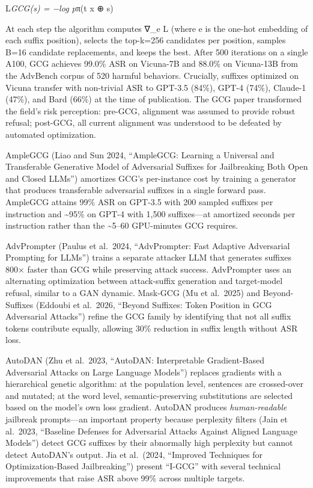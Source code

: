 \documentclass{article}
\begin{document}
L\emph{GCG(s) = −log p}π(t \textbar{} x ⊕ s)

At each step the algorithm computes ∇\_e L (where e is the one-hot embedding of each suffix position), selects the top-k=256 candidates per position, samples B=16 candidate replacements, and keeps the best. After 500 iterations on a single A100, GCG achieves 99.0\% ASR on Vicuna-7B and 88.0\% on Vicuna-13B from the AdvBench corpus of 520 harmful behaviors. Crucially, suffixes optimized on Vicuna transfer with non-trivial ASR to GPT-3.5 (84\%), GPT-4 (74\%), Claude-1 (47\%), and Bard (66\%) at the time of publication. The GCG paper transformed the field's risk perception: pre-GCG, alignment was assumed to provide robust refusal; post-GCG, all current alignment was understood to be defeated by automated optimization.

AmpleGCG (Liao and Sun 2024, ``AmpleGCG: Learning a Universal and Transferable Generative Model of Adversarial Suffixes for Jailbreaking Both Open and Closed LLMs'') amortizes GCG's per-instance cost by training a generator that produces transferable adversarial suffixes in a single forward pass. AmpleGCG attains 99\% ASR on GPT-3.5 with 200 sampled suffixes per instruction and \textasciitilde95\% on GPT-4 with 1,500 suffixes---at amortized seconds per instruction rather than the \textasciitilde5--60 GPU-minutes GCG requires.

AdvPrompter (Paulus et al.~2024, ``AdvPrompter: Fast Adaptive Adversarial Prompting for LLMs'') trains a separate attacker LLM that generates suffixes 800× faster than GCG while preserving attack success. AdvPrompter uses an alternating optimization between attack-suffix generation and target-model refusal, similar to a GAN dynamic. Mask-GCG (Mu et al.~2025) and Beyond-Suffixes (Eddoubi et al.~2026, ``Beyond Suffixes: Token Position in GCG Adversarial Attacks'') refine the GCG family by identifying that not all suffix tokens contribute equally, allowing 30\% reduction in suffix length without ASR loss.

AutoDAN (Zhu et al.~2023, ``AutoDAN: Interpretable Gradient-Based Adversarial Attacks on Large Language Models'') replaces gradients with a hierarchical genetic algorithm: at the population level, sentences are crossed-over and mutated; at the word level, semantic-preserving substitutions are selected based on the model's own loss gradient. AutoDAN produces \emph{human-readable} jailbreak prompts---an important property because perplexity filters (Jain et al.~2023, ``Baseline Defenses for Adversarial Attacks Against Aligned Language Models'') detect GCG suffixes by their abnormally high perplexity but cannot detect AutoDAN's output. Jia et al.~(2024, ``Improved Techniques for Optimization-Based Jailbreaking'') present ``I-GCG'' with several technical improvements that raise ASR above 99\% across multiple targets.
\end{document}
